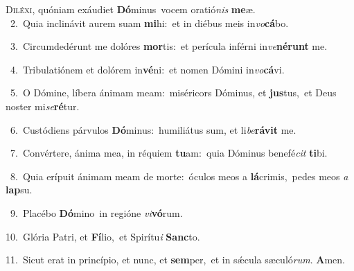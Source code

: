 \lettrine{\initial\textcolor{\initialcolor}{D}}{iléxi,} quóniam exáudiet \textbf{Dó}\-minus~\star vocem oratió\textit{nis} \textbf{me}\-æ.\\
{\numbfont\textcolor{\numbcolor}{~2.}}~Quia inclinávit aurem suam \textbf{mi}\-hi:~\star et in diébus meis in\-\textit{vo}\-\textbf{cá}bo.\par
{\numbfont\textcolor{\numbcolor}{~3.}}~Circumdedérunt me dolóres \textbf{mor}\-tis:~\star et perícula inférni in\-\textit{ve}\-\textbf{né}\textbf{runt} me.\par
{\numbfont\textcolor{\numbcolor}{~4.}}~Tribulatiónem et dolórem in\-\textbf{vé}\-ni:~\star et nomen Dómini in\-\textit{vo}\-\textbf{cá}vi.\par
{\numbfont\textcolor{\numbcolor}{~5.}}~O Dómine, líbera ánimam meam:~\dagger miséricors Dóminus, et \textbf{jus}\-tus,~\star et Deus noster mi\-\textit{se}\-\textbf{ré}tur.\par
{\numbfont\textcolor{\numbcolor}{~6.}}~Custódiens párvulos \textbf{Dó}\-minus:~\star humiliátus sum, et li\-\textit{be}\-\textbf{rá}\textbf{vit} me.\par
{\numbfont\textcolor{\numbcolor}{~7.}}~Convértere, ánima mea, in réquiem \textbf{tu}\-am:~\star quia Dóminus benefé\textit{cit} \textbf{ti}\-bi.\par
{\numbfont\textcolor{\numbcolor}{~8.}}~Quia erípuit ánimam meam de morte:~\dagger óculos meos a \textbf{lá}\-crimis,~\star pedes meos \textit{a} \textbf{lap}\-su.\par
{\numbfont\textcolor{\numbcolor}{~9.}}~Placébo \textbf{Dó}\-mino~\star in regióne \textit{vi}\-\textbf{vó}rum.\par
{\numbfont\textcolor{\numbcolor}{10.}}~Glória Patri, et \textbf{Fí}\-lio,~\star et Spirítu\textit{i} \textbf{Sanc}\-to.\par
{\numbfont\textcolor{\numbcolor}{11.}}~Sicut erat in princípio, et nunc, et \textbf{sem}\-per,~\star et in sǽcula sæculó\-\textit{rum}\-. \textbf{A}\-men.\par
